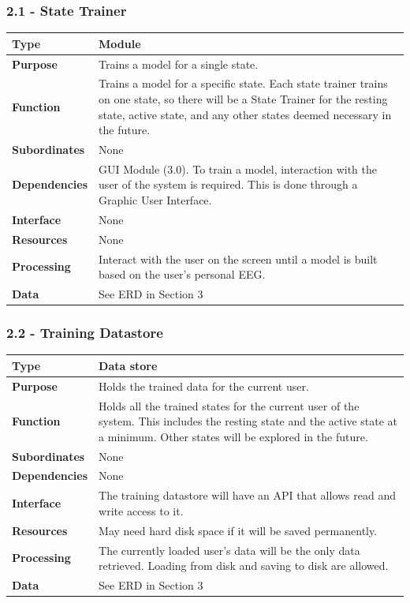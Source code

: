 \documentclass{article}
\begin{document}
\subsubsection*{2.1 - State Trainer}
\begin{tabular}{ | l |  p{13.3cm} |}
\hline
\textbf{Type} & Module \\ \hline
\textbf{Purpose} & Trains a model for a single state. \\ \hline
\textbf{Function} & Trains a model for a specific state. Each state trainer trains on one state, so there will be a State Trainer for the resting state, active state, and any other states deemed necessary in the future. \\ \hline
\textbf{Subordinates} & None \\ \hline
\textbf{Dependencies} & GUI Module (3.0). To train a model, interaction with the user of the system is required. This is done through a Graphic User Interface.  \\ \hline
\textbf{Interface} & None \\ \hline
\textbf{Resources} & None \\ \hline
\textbf{Processing} & Interact with the user on the screen until a model is built based on the user's personal EEG. \\ \hline
\textbf{Data} & See ERD in Section 3 \\ \hline
\end{tabular}

\subsubsection*{2.2 - Training Datastore}
\begin{tabular}{ | l |  p{13.3cm} |}
\hline
\textbf{Type} & Data store \\ \hline
\textbf{Purpose} & Holds the trained data for the current user. \\ \hline
\textbf{Function} & Holds all the trained states for the current user of the system. This includes the resting state and the active state at a minimum. Other states will be explored in the future. \\ \hline
\textbf{Subordinates} & None \\ \hline
\textbf{Dependencies} & None \\ \hline
\textbf{Interface} & The training datastore will have an API that allows read and write access to it. \\ \hline
\textbf{Resources} & May need hard disk space if it will be saved permanently.  \\ \hline
\textbf{Processing} & The currently loaded user's data will be the only data retrieved. Loading from disk and saving to disk are allowed. \\ \hline
\textbf{Data} & See ERD in Section 3 \\ \hline
\end{tabular}
\end{document}
